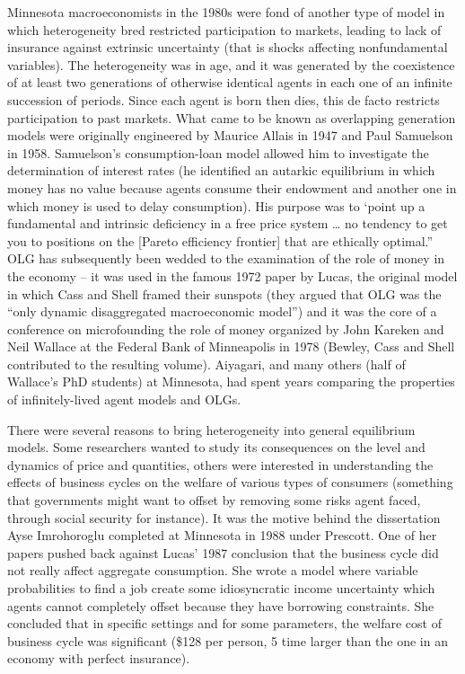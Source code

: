 \documentclass[cn,10pt,math=newtx,citestyle=gb7714-2015,bibstyle=gb7714-2015]{elegantbook}
\begin{document}
	Minnesota macroeconomists in the 1980s were fond of another type of model in which heterogeneity bred restricted participation to markets, leading to lack of insurance against extrinsic uncertainty (that is shocks affecting nonfundamental variables). The heterogeneity was in age, and it was generated by the coexistence of at least two generations of otherwise identical agents in each one of an infinite succession of periods. Since each agent is born then dies, this  de facto restricts participation to past markets. What came to be known as overlapping generation models were originally engineered by Maurice Allais in 1947 and Paul Samuelson in 1958. Samuelson’s consumption-loan model allowed him to investigate the determination of interest rates (he identified an autarkic equilibrium in which money has no value because agents consume their endowment and another one in which money is used to delay consumption). His purpose was to ‘point up a fundamental and intrinsic deficiency in a free price system … no tendency to get you to positions on the [Pareto efficiency frontier] that are ethically optimal.” OLG has subsequently been wedded to the examination of the role of money in the economy – it was used in the famous 1972 paper by Lucas, the original model in which Cass and Shell framed their sunspots (they argued that OLG was the “only dynamic disaggregated macroeconomic model”) and it was the core of a conference on microfounding the role of money organized by John Kareken and Neil Wallace at the Federal Bank of Minneapolis in 1978 (Bewley, Cass and Shell contributed to the resulting volume). Aiyagari, and many others (half of Wallace’s PhD students) at Minnesota, had spent years comparing the properties of infinitely-lived agent models and OLGs.
	
	There were several reasons to bring heterogeneity into general equilibrium models. Some researchers wanted to study its consequences on the level and dynamics of price and quantities, others were interested in understanding the effects of business cycles on the welfare of various types of consumers (something that governments might want to offset by removing some risks agent faced, through social security for instance). It was the motive behind the dissertation Ayse Imrohoroglu completed at Minnesota in 1988 under Prescott. One of her papers pushed back against Lucas’ 1987 conclusion that the business cycle did not really affect aggregate consumption. She wrote a model where variable probabilities to find a job create some idiosyncratic income uncertainty which agents cannot completely offset because they have borrowing constraints. She concluded that in specific settings and for some parameters, the welfare cost of business cycle was significant (\$128 per person, 5 time larger than the one in an economy with perfect insurance).
	
\end{document}
